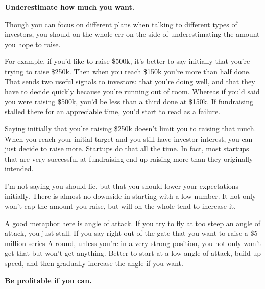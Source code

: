                     \textbf{Underestimate how much you want.}

Though
                    you can focus on different plans when talking to different
                    types of investors, you should on the whole err on the side
                    of underestimating the amount you hope to raise.

For
                    example, if you'd like to raise \$500k, it's better to say
                    initially that you're trying to raise \$250k. Then when you
                    reach \$150k you're more than half done. That sends two
                    useful signals to investors: that you're doing well, and
                    that they have to decide quickly because you're running out
                    of room. Whereas if you'd said you were raising \$500k, you'd
                    be less than a third done at \$150k. If fundraising stalled
                    there for an appreciable time, you'd start to read as a
                    failure.

Saying initially that you're raising
                    \$250k doesn't limit you to raising that much. When you reach
                    your initial target and you still have investor interest,
                    you can just decide to raise more. Startups do that all the
                    time. In fact, most startups that are very successful at
                    fundraising end up raising more than they originally
                    intended.

I'm not saying you should lie, but that
                    you should lower your expectations initially. There is
                    almost no downside in starting with a low number. It not
                    only won't cap the amount you raise, but will on the whole
                    tend to increase it.

A good metaphor here is
                    angle of attack. If you try to fly at too steep an angle of
                    attack, you just stall. If you say right out of the gate
                    that you want to raise a \$5 million series A round, unless
                    you're in a very strong position, you not only won't get
                    that but won't get anything. Better to start at a low angle
                    of attack, build up speed, and then gradually increase the
                    angle if you want.


                    \textbf{Be profitable if you can.}


